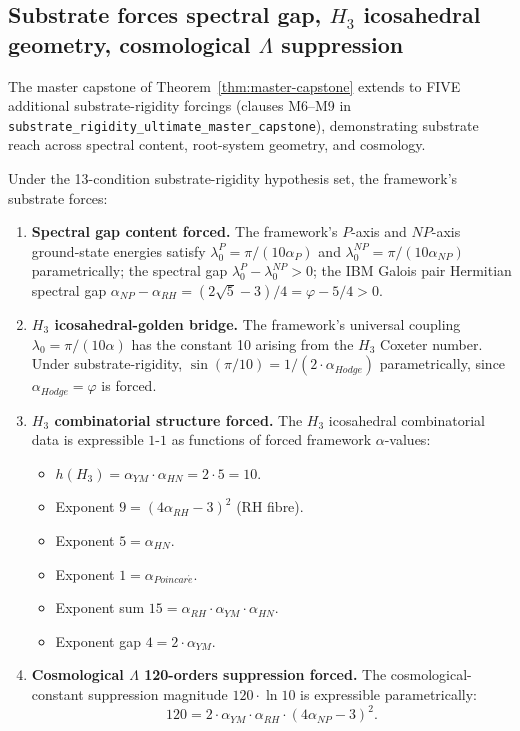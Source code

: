 \subsection{Substrate forces spectral gap, \texorpdfstring{$H_3$}{H\_3} icosahedral geometry, cosmological \texorpdfstring{$\Lambda$}{Lambda} suppression}
\label{subsec:m6-m9-additional}

The master capstone of
Theorem~\ref{thm:master-capstone} extends to FIVE additional
substrate-rigidity forcings (clauses M6--M9 in
\texttt{substrate\_\allowbreak{}rigidity\_\allowbreak{}ultimate\_\allowbreak{}master\_\allowbreak{}capstone}), demonstrating
substrate reach across spectral content, root-system geometry, and
cosmology.

\begin{theorem}
\label{thm:m6-m9}
Under the 13-condition substrate-rigidity hypothesis set, the
framework's substrate forces:

\begin{enumerate}
\item[(M6)] \textbf{Spectral gap content forced.} The framework's
$P$-axis and $NP$-axis ground-state energies satisfy
$\lambda_0^P = \pi/(10 \alpha_P)$ and
$\lambda_0^{NP} = \pi/(10 \alpha_{NP})$ parametrically; the spectral
gap $\lambda_0^P - \lambda_0^{NP} > 0$; the IBM Galois pair
Hermitian spectral gap $\alpha_{NP} - \alpha_{RH} =
(2\sqrt{5} - 3)/4 = \varphi - 5/4 > 0$.

\item[(M7)] \textbf{$H_3$ icosahedral-golden bridge.} The framework's
universal coupling $\lambda_0 = \pi/(10\alpha)$ has the constant 10
arising from the $H_3$ Coxeter number. Under substrate-rigidity,
$\sin(\pi/10) = 1/(2 \cdot \alpha_{Hodge})$ parametrically, since
$\alpha_{Hodge} = \varphi$ is forced.

\item[(M8)] \textbf{$H_3$ combinatorial structure forced.} The $H_3$
icosahedral combinatorial data is expressible $1$-$1$ as functions
of forced framework $\alpha$-values:
\begin{itemize}
\setlength{\itemsep}{0pt}
\item $h(H_3) = \alpha_{YM} \cdot \alpha_{HN} = 2 \cdot 5 = 10$.
\item Exponent $9 = (4\alpha_{RH} - 3)^2$ (RH fibre).
\item Exponent $5 = \alpha_{HN}$.
\item Exponent $1 = \alpha_{Poincar\acute{e}}$.
\item Exponent sum $15 = \alpha_{RH} \cdot \alpha_{YM} \cdot \alpha_{HN}$.
\item Exponent gap $4 = 2 \cdot \alpha_{YM}$.
\end{itemize}

\item[(M9)] \textbf{Cosmological $\Lambda$ 120-orders suppression
forced.} The cosmological-constant suppression magnitude
$120 \cdot \ln 10$ is expressible parametrically:
\[
120 = 2 \cdot \alpha_{YM} \cdot \alpha_{RH} \cdot (4\alpha_{NP} - 3)^2.
\]
\end{enumerate}
\end{theorem}


